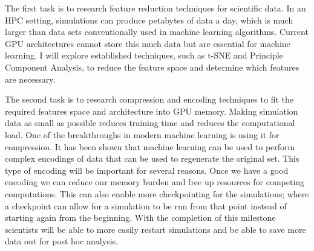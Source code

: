 \documentclass[12pt]{article}
\begin{document}

 The first task is to research feature reduction techniques for
scientific data. In an HPC setting, simulations can produce petabytes of data a
day, which is much larger than data sets conventionally used in machine learning
algorithms. Current GPU architectures cannot store this much data but are
essential for machine learning. I will explore established techniques, such as
t-SNE and Principle Component Analysis, to reduce the feature space and
determine which features are necessary.

 The second task is to research compression and encoding techniques to
fit the required features space and architecture into GPU memory. Making
simulation data as small as possible reduces training time and reduces the
computational load. One of the breakthroughs in modern machine learning is using
it for compression. It has been shown that machine learning can be used to
perform complex encodings of data that can be used to regenerate the original
set. This type of encoding will be important for several reasons. Once we have a
good encoding we can reduce our memory burden and free up resources for
competing computations. This can also enable more checkpointing for the
simulations; where a checkpoint can allow for a simulation to be run from that
point instead of starting again from the beginning. With the completion of this
milestone scientists will be able to more easily restart simulations and be able
to save more data out for post hoc analysis.
\end{document}
